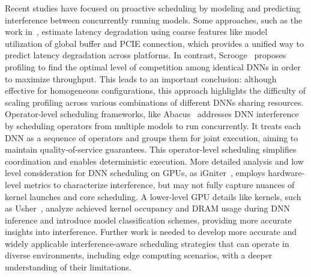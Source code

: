 Recent studies have focused on proactive scheduling by modeling and predicting interference between concurrently running models. 
Some approaches, such as the work in~\cite{mendoza2021interference}, estimate latency degradation using coarse features like model utilization of global buffer and PCIE connection, which provides a unified way to predict latency degradation across platforms. 
In contrast, Scrooge~\cite{hu2021scrooge} proposes profiling to find the optimal level of competition among identical DNNs in order to maximize throughput. This leads to an important conclusion: although effective for homogeneous configurations, this approach highlights the difficulty of scaling profiling across various combinations of different DNNs sharing resources.
Operator-level scheduling frameworks, like Abacus~\cite{cui2021Abacus} addresses DNN interference by scheduling operators from multiple models to run concurrently. It treats each DNN as a sequence of operators and groups them for joint execution, aiming to maintain quality-of-service guarantees. This operator-level scheduling simplifies coordination and enables deterministic execution.
More detailed analysis and low level consideration for DNN scheduling on GPUs, as iGniter~\cite{xu2022igniter}, employs hardware-level metrics to characterize interference, but may not fully capture nuances of kernel launches and core scheduling.
A lower-level GPU details like kernels, such as Usher~\cite{shubha2024usher}, analyze achieved kernel occupancy and DRAM usage during DNN inference and introduce model classification schemes, providing more accurate insights into interference.
Further work is needed to develop more accurate and widely applicable interference-aware scheduling strategies that can operate in diverse environments, including edge computing scenarios, with a deeper understanding of their limitations.